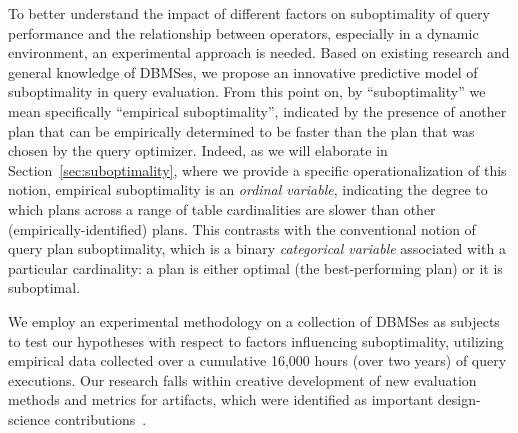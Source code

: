 \documentclass[prodmode,acmtods]{acmsmall}
\begin{document}
To better understand the impact of different factors on suboptimality of
query performance and the relationship between operators, especially in a
dynamic environment, an experimental approach is needed.  Based on existing
research and general knowledge of \hbox{DBMSes}, we propose an innovative
predictive model of suboptimality in query evaluation. From this point on,
by ``suboptimality'' we mean specifically ``empirical suboptimality'',
indicated by the presence of another plan that can be empirically determined
to be faster than the plan that was chosen by the query optimizer. Indeed,
as we will elaborate in Section~\ref{sec:suboptimality}, where we provide a
specific operationalization of this notion, empirical suboptimality is an
{\em ordinal variable}, indicating the degree to which plans across a
range of table cardinalities are slower than other (empirically-identified)
plans. This contrasts with the conventional notion of query plan
suboptimality, which is a binary {\em categorical variable} associated with
a particular cardinality: a plan is either optimal (the best-performing
plan) or it is suboptimal.

We employ an experimental methodology on a collection of \hbox{DBMSes} as
subjects to test our hypotheses with respect to factors influencing
suboptimality, utilizing empirical data collected over a \hbox{cumulative}
16,000 hours (over two years) of query executions.  Our research falls
within creative development of new evaluation methods and metrics for
artifacts, which were identified as important design-science
contributions~\cite{hevner04}.
\end{document}
